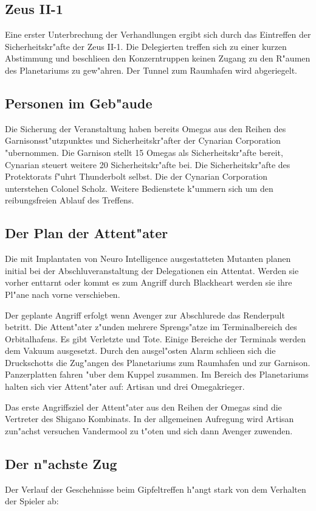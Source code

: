 \subsection{Zeus II-1} 
Eine erster Unterbrechung der Verhandlungen ergibt sich durch das Eintreffen der Sicherheitskr"afte der Zeus II-1. Die Delegierten treffen sich zu einer kurzen Abstimmung und beschlie\3en den Konzerntruppen keinen Zugang zu den R"aumen des Planetariums zu gew"ahren. Der Tunnel zum Raumhafen wird abgeriegelt. 

\subsection{Personen im Geb"aude} 
Die Sicherung der Veranstaltung haben bereits Omegas aus den Reihen des Garnisonsst"utzpunktes und Sicherheitskr"after der Cynarian Corporation "ubernommen. Die Garnison stellt 15 Omegas als Sicherheitskr"afte bereit, Cynarian steuert weitere 20 Sicherheitskr"afte bei. Die Sicherheitskr"afte des Protektorats f"uhrt Thunderbolt selbst. Die der Cynarian Corporation unterstehen Colonel Scholz. Weitere Bedienstete k"ummern sich um den reibungsfreien Ablauf des Treffens.

\subsection{Der Plan der Attent"ater} 
Die mit Implantaten von Neuro Intelligence ausgestatteten Mutanten planen initial bei der Abschlu\3veranstaltung der Delegationen ein Attentat. Werden sie vorher enttarnt oder kommt es zum Angriff durch Blackheart werden sie ihre Pl"ane nach vorne verschieben.

Der geplante Angriff erfolgt wenn Avenger zur Abschlu\3rede das Renderpult betritt. Die Attent"ater z"unden mehrere Sprengs"atze im Terminalbereich des Orbitalhafens. Es gibt Verletzte und Tote. Einige Bereiche der Terminals werden dem Vakuum ausgesetzt. Durch den ausgel"osten Alarm schlie\3en sich die Druckschotts die Zug"angen des Planetariums zum Raumhafen und zur Garnison. Panzerplatten fahren "uber dem Kuppel zusammen. Im Bereich des Planetariums halten sich vier Attent"ater auf: Artisan und drei Omegakrieger.

Das erste Angriffsziel der Attent"ater aus den Reihen der Omegas sind die Vertreter des Shigano Kombinats. In der allgemeinen Aufregung wird Artisan zun"achst versuchen Vandermool zu t"oten und sich dann Avenger zuwenden.

\subsection{Der n"achste Zug} 
Der Verlauf der Geschehnisse beim Gipfeltreffen h"angt stark von dem Verhalten der Spieler ab:

